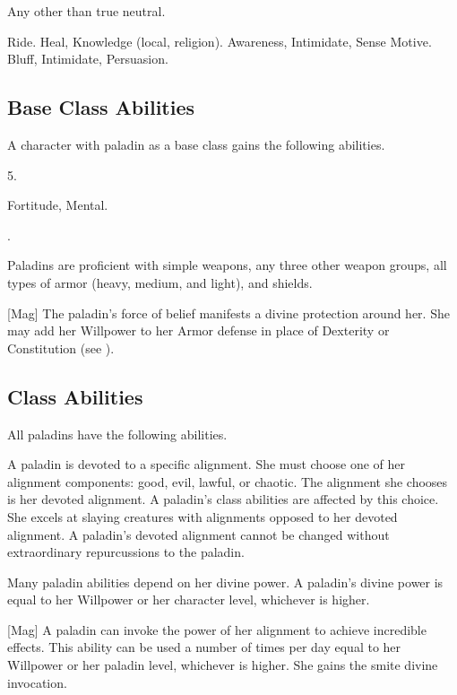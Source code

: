      Any other than true neutral.

     Ride.
     Heal, Knowledge (local, religion).
     Awareness, Intimidate, Sense Motive.
     Bluff, Intimidate, Persuasion.

    \subsection{Base Class Abilities}
        A character with paladin as a base class gains the following abilities.

         5.

          Fortitude,  Mental.

         .

        Paladins are proficient with simple weapons, any three other weapon groups, all types of armor (heavy, medium, and light), and shields.

        [Mag]
        The paladin's force of belief manifests a divine protection around her.
        She may add her Willpower to her Armor defense in place of Dexterity or Constitution (see ).

    \subsection{Class Abilities}
        All paladins have the following abilities.

        A paladin is devoted to a specific alignment.
        She must choose one of her alignment components: good, evil, lawful, or chaotic.
        The alignment she chooses is her devoted alignment.
        A paladin's class abilities are affected by this choice.
        She excels at slaying creatures with alignments opposed to her devoted alignment.
        A paladin's devoted alignment cannot be changed without extraordinary repurcussions to the paladin.

        Many paladin abilities depend on her divine power.
        A paladin's divine power is equal to her Willpower or her character level, whichever is higher.

        [Mag]
        A paladin can invoke the power of her alignment to achieve incredible effects.
        This ability can be used a number of times per day equal to her Willpower or her paladin level, whichever is higher.
        She gains the smite divine invocation.

